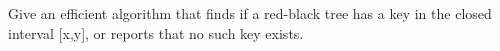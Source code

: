 Give an efficient algorithm that finds if a red-black tree has a key 
in the closed interval [x,y], or reports that no such key exists.
